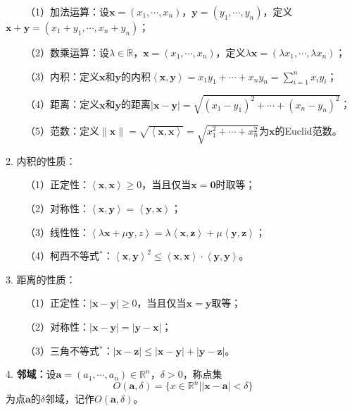 ~~~~（1）加法运算：设$\boldsymbol{x}=(x_1,\cdots,x_n)$，$\boldsymbol{y}=(y_1,\cdots,y_n)$，定义$\boldsymbol{x}+\boldsymbol{y}=(x_1+y_1,\cdots,x_n+y_n)$；

~~~~（2）数乘运算：设$\lambda\in \mathbb{R}$，$\boldsymbol{x}=(x_1,\cdots,x_n)$，定义$\lambda\boldsymbol{x}=(\lambda x_1,\cdots,\lambda x_n)$；

~~~~（3）内积：定义$\boldsymbol{x}$和$\boldsymbol{y}$的内积$\left\langle\boldsymbol{x},\boldsymbol{y}\right\rangle=x_1y_1+\cdots+x_ny_n=\sum\limits_{i=1}^n x_iy_i$；

~~~~（4）距离：定义$\boldsymbol{x}$和$\boldsymbol{y}$的距离$|\boldsymbol{x}-\boldsymbol{y}|=\sqrt{(x_1-y_1)^2+\cdots+(x_n-y_n)^2}$；

~~~~（5）范数：定义$\|\boldsymbol{x}\|=\sqrt{\left\langle\boldsymbol{x},\boldsymbol{x}\right\rangle}=\sqrt{x_1^2+\cdots+x_n^2}$为$\boldsymbol{x}$的Euclid范数。

2. 内积的性质：

~~~~（1）正定性：$\left\langle\boldsymbol{x},\boldsymbol{x}\right\rangle\geqslant 0$，当且仅当$\boldsymbol{x}=\boldsymbol{0}$时取等；

~~~~（2）对称性：$\left\langle\boldsymbol{x},\boldsymbol{y}\right\rangle=\left\langle\boldsymbol{y},\boldsymbol{x}\right\rangle$；

~~~~（3）线性性：$\left\langle\lambda\boldsymbol{x}+\mu\boldsymbol{y},z\right\rangle=\lambda\left\langle\boldsymbol{x},\boldsymbol{z}\right\rangle+\mu\left\langle\boldsymbol{y},\boldsymbol{z}\right\rangle$；

~~~~（4）柯西不等式$^*$：$\left\langle\boldsymbol{x},\boldsymbol{y}\right\rangle^2\leqslant \left\langle\boldsymbol{x},\boldsymbol{x}\right\rangle\cdot\left\langle\boldsymbol{y},\boldsymbol{y}\right\rangle$。

3. 距离的性质：

~~~~（1）正定性：$|\boldsymbol{x}-\boldsymbol{y}|\geqslant 0$，当且仅当$\boldsymbol{x}=\boldsymbol{y}$取等；

~~~~（2）对称性：$|\boldsymbol{x}-\boldsymbol{y}|=|\boldsymbol{y}-\boldsymbol{x}|$；

~~~~（3）三角不等式$^*$：$|\boldsymbol{x}-\boldsymbol{z}|\leqslant |\boldsymbol{x}-\boldsymbol{y}|+|\boldsymbol{y}-\boldsymbol{z}|$。

4. \textbf{邻域：}设$\boldsymbol{a}=(a_1,\cdots,a_n)\in \mathbb{R}^n$，$\delta>0$，称点集
\begin{equation*}
    O(\boldsymbol{a},\delta)=\{x\in \mathbb{R}^n\Big| |\boldsymbol{x}-\boldsymbol{a}|<\delta\}
\end{equation*}
为点$\boldsymbol{a}$的$\delta$邻域，记作$O(\boldsymbol{a},\delta)$。

